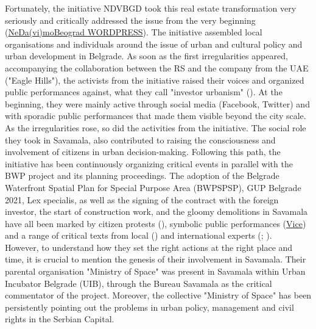 \documentclass[11pt]{report}
\begin{document}
{{{{Fortunately, the initiative NDVBGD took this real estate transformation very seriously and critically addressed the issue from the very beginning (\href{NDVBGD}{NeDa(vi)moBeograd WORDPRESS}). %
The initiative assembled local organisations and individuals around the issue of urban and cultural policy and urban development in Belgrade. As soon as the first irregularities appeared, accompanying the collaboration between the RS and the company from the UAE ("Eagle Hills"), the activists from the initiative raised their voices and organized public performances against, what they call "investor urbanism" (\cite{SlobodnaEvropa2014}).%
 At the beginning, they were mainly active through social media (Facebook, Twitter) and with sporadic public performances that made them visible beyond the city scale.
\\

As the irregularities rose, so did the activities from the initiative. The social role they took in Savamala, also contributed to raising the consciousness and involvement of citizens in urban decision-making. Following this path, the initiative has been continuously organizing critical events in parallel with the BWP project and its planning proceedings. The adoption of the Belgrade Waterfront Spatial Plan for Special Purpose Area (BWPSPSP), GUP Belgrade 2021, Lex specialis, as well as the signing of the contract with the foreign investor, the start of construction work, and the gloomy demolitions in Savamala have all been marked by citizen protests (\href{Mitic}{\citealt{mitic_ekskluzivno:_2016}}), symbolic public performances (\href{vice}{Vice}) and a range of critical texts from local (\href{Petovar}{\citealt{petovar_princip_2014}}) and international experts (\href{Spectacle}{\citealt{the_spectacle_blog_inura_2014}}; \href{ref}{\citealt{krusche_bureau_2015}}).
\\

However, to  understand how they set the right actions at the right place and time, it is crucial to mention the genesis of their involvement in Savamala. Their parental organisation "Ministry of Space" was present in Savamala within Urban Incubator Belgrade (UIB), through the Bureau Savamala as the critical commentator of the project. Moreover, the collective "Ministry of Space" has been persistently pointing out the problems in urban policy, management and civil rights in the Serbian Capital.
\\

}}}}
\end{document}
